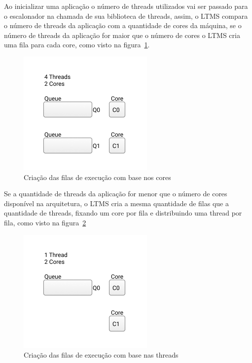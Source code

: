 \documentclass[diss,capa]{texufpel}
\begin{document}
Ao inicializar uma aplicação o número de threads utilizados vai ser passado para o escalonador na chamada de sua biblioteca de threads, assim, o LTMS compara o número de threads da aplicação com a quantidade de cores da máquina, se o número de threads da aplicação for maior que o número de cores o LTMS cria uma fila para cada core, como visto na figura~\ref{queue_core}.

\begin{figure}[htbp]
 \centering
 \includegraphics[scale=.8]{images/Queue_core.png}
 \caption{Criação das filas de execução com base nos cores}
\label{queue_core}
\end{figure}

Se a quantidade de threads da aplicação for menor que o número de cores disponível na arquitetura, o LTMS cria a mesma quantidade de filas que a quantidade de threads, fixando um core por fila e distribuindo uma thread por fila, como visto na figura~\ref{queue_thread}

\begin{figure}[htbp]
 \centering
 \includegraphics[scale=.8]{images/Queues_thread.png}
\caption{Criação das filas de execução com base nas threads}
\label{queue_thread}
\end{figure}

\end{document}
